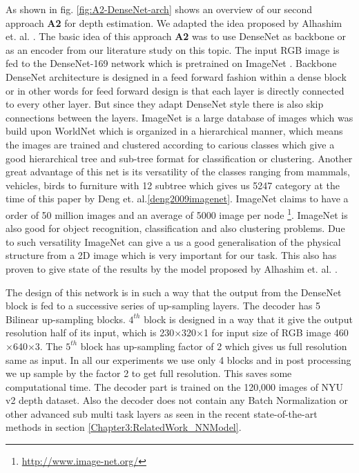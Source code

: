 As shown in fig. \ref{fig:A2-DenseNet-arch} shows an overview of our second approach \textbf{A2} for depth estimation. We adapted the idea proposed by Alhashim et. al. \cite{Alhashim2018}. The basic idea of this approach \textbf{A2} was to use DenseNet as backbone or as an encoder from our literature study on this topic. The input RGB image is fed to the DenseNet-169 \cite{huang2017densely} network which is pretrained on ImageNet \cite{deng2009imagenet}.  Backbone DenseNet architecture is designed in a feed forward fashion within a dense block or in other words for feed forward design is that each layer is directly connected to every other layer. But since they adapt DenseNet style there is also skip connections between the layers. ImageNet is a large database of images which was build upon WorldNet which is organized in a hierarchical manner, which means the images are trained and clustered according to carious classes which give a good hierarchical tree and sub-tree format for classification or clustering. Another great advantage of this net is its versatility of the classes ranging from mammals, vehicles, birds to furniture with 12 subtree which gives us 5247 category at the time of this paper by Deng et. al.\ref{deng2009imagenet}. ImageNet claims to have a order of 50 million images and an average of 5000 image per node \footnote{\url{http://www.image-net.org/}}. ImageNet is also good for object recognition, classification and also clustering problems. Due to such versatility ImageNet can give a us a good generalisation of the physical structure from a 2D image which is very important for our task. This also has proven to give state of the results by the model proposed by Alhashim et. al. \cite{Alhashim2018}. 


The design of this network is in such a way that the output from the DenseNet block is  fed to a successive series of up-sampling layers. The decoder has 5 Bilinear up-sampling blocks. \(4^{th}\) block is designed in a way that it give the output resolution half of its input, which is 230$\times$320$\times$1 for input size of RGB image 460$\times$640$\times$3. The \(5^{th}\) block has up-sampling factor of 2 which gives us full resolution same as input. In all our experiments we use only 4 blocks and in post processing we up sample by the factor 2 to get full resolution. This saves some computational time. The decoder part is trained on the 120,000 images of NYU v2 depth dataset. Also the decoder does not contain any Batch Normalization or other advanced sub multi task layers as seen in the recent state-of-the-art methods in section \ref{Chapter3:RelatedWork_NNModel}.

